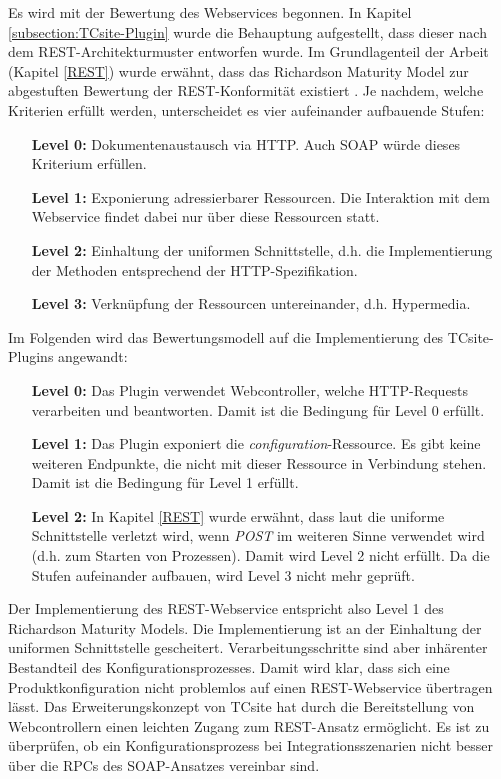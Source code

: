 \documentclass[11pt, a4paper, titlepage, listof=totoc, bibliography=totoc, index=totoc, twoside, openright, headings=normal]{scrreprt}
\begin{document}
Es wird mit der Bewertung des Webservices begonnen. In Kapitel \ref{subsection:TCsite-Plugin} wurde die Behauptung aufgestellt, dass dieser nach dem REST-Architekturmuster entworfen wurde. Im Grundlagenteil der Arbeit (Kapitel \ref{REST}) wurde erwähnt, dass das \glqq Richardson Maturity Model\grqq{} zur abgestuften Bewertung der REST-Konformität existiert \citep{wilde11}. Je nachdem, welche Kriterien erfüllt werden, unterscheidet es vier aufeinander aufbauende Stufen:
\begin{enumerate}
\item[\textbf{Level 0:}] Dokumentenaustausch via HTTP. Auch SOAP würde dieses Kriterium erfüllen.
\item[\textbf{Level 1:}] Exponierung adressierbarer Ressourcen. Die Interaktion mit dem Webservice findet dabei nur über diese Ressourcen statt.
\item[\textbf{Level 2:}] Einhaltung der uniformen Schnittstelle, d.h. die Implementierung der Methoden entsprechend der HTTP-Spezifikation.
\item[\textbf{Level 3:}] Verknüpfung der Ressourcen untereinander, d.h. Hypermedia.
\end{enumerate}

Im Folgenden wird das Bewertungsmodell auf die Implementierung des TCsite-Plugins angewandt:
\begin{enumerate}
\item[\textbf{Level 0:}] Das Plugin verwendet Webcontroller, welche HTTP-Requests verarbeiten und beantworten. Damit ist die Bedingung für Level 0 erfüllt.
\item[\textbf{Level 1:}] Das Plugin exponiert die \emph{configuration}-Ressource. Es gibt keine weiteren Endpunkte, die nicht mit dieser Ressource in Verbindung stehen. Damit ist die Bedingung für Level 1 erfüllt.
\item[\textbf{Level 2:}] In Kapitel \ref{REST} wurde erwähnt, dass laut \citet{richardson07} die uniforme Schnittstelle verletzt wird, wenn \emph{POST} im weiteren Sinne verwendet wird (d.h. zum Starten von Prozessen). Damit wird Level 2 nicht erfüllt. Da die Stufen aufeinander aufbauen, wird Level 3 nicht mehr geprüft.
\end{enumerate}

Der Implementierung des REST-Webservice entspricht also Level 1 des \glqq Richardson Maturity Models\grqq{}. Die Implementierung ist an der Einhaltung der uniformen Schnittstelle gescheitert. Verarbeitungsschritte sind aber inhärenter Bestandteil des Konfigurationsprozesses. Damit wird klar, dass sich eine Produktkonfiguration nicht problemlos auf einen REST-Webservice übertragen lässt. Das Erweiterungskonzept von TCsite hat durch die Bereitstellung von Webcontrollern einen leichten Zugang zum REST-Ansatz ermöglicht. Es ist zu überprüfen, ob ein Konfigurationsprozess bei Integrationsszenarien nicht besser über die RPCs des SOAP-Ansatzes vereinbar sind.
\end{document}
